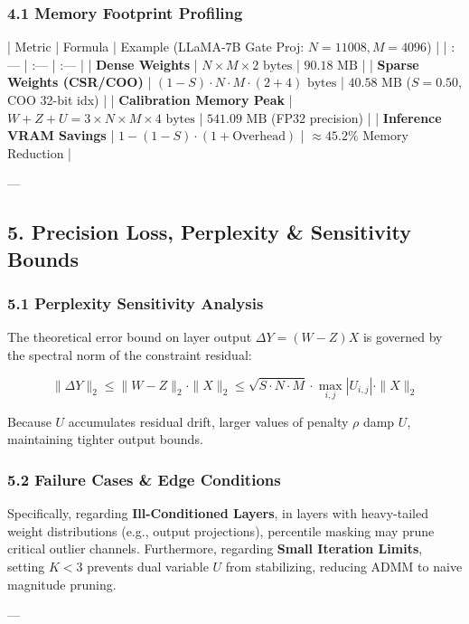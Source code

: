\subsubsection{4.1 Memory Footprint Profiling}

| Metric | Formula | Example (LLaMA-7B Gate Proj: $N=11008, M=4096$) |
| :--- | :--- | :--- |
| \textbf{Dense Weights} | $N \times M \times 2 \text{ bytes}$ | $90.18 \text{ MB}$ |
| \textbf{Sparse Weights (CSR/COO)} | $(1 - S) \cdot N \cdot M \cdot (2 + 4) \text{ bytes}$ | $40.58 \text{ MB}$ ($S=0.50$, COO 32-bit idx) |
| \textbf{Calibration Memory Peak} | $W + Z + U = 3 \times N \times M \times 4 \text{ bytes}$ | $541.09 \text{ MB}$ (FP32 precision) |
| \textbf{Inference VRAM Savings} | $1 - (1 - S) \cdot (1 + \text{Overhead})$ | $\approx 45.2\%$ Memory Reduction |

---

\subsection{5. Precision Loss, Perplexity \& Sensitivity Bounds}
\subsubsection{5.1 Perplexity Sensitivity Analysis}

The theoretical error bound on layer output $\Delta Y = (W - Z) X$ is governed by the spectral norm of the constraint residual:

$$\| \Delta Y \|_2 \le \| W - Z \|_2 \cdot \| X \|_2 \le \sqrt{S \cdot N \cdot M} \cdot \max_{i,j} |U_{i,j}| \cdot \| X \|_2$$

Because $U$ accumulates residual drift, larger values of penalty $\rho$ damp $U$, maintaining tighter output bounds.

\subsubsection{5.2 Failure Cases \& Edge Conditions}

Specifically, regarding \textbf{Ill-Conditioned Layers}, in layers with heavy-tailed weight distributions (e.g., output projections), percentile masking may prune critical outlier channels. Furthermore, regarding \textbf{Small Iteration Limits}, setting $K < 3$ prevents dual variable $U$ from stabilizing, reducing ADMM to naive magnitude pruning.


---